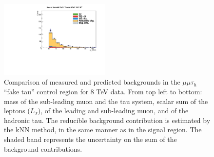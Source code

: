 \begin{figure}
\begin{center}
  \includegraphics[width=0.49\textwidth]{4_Analisys/pics/8TeV/plots/mmt/f3/Full/final-f3-tPt-Full.pdf}
  \caption{Comparison of measured and predicted backgrounds in the $\mu\mu\tau_h$ ``fake tau'' control region for 8 TeV data.
  From top left to bottom: mass of the sub-leading muon and the tau system, scalar sum of the leptons \pT ($L_T$), \pT of the leading and sub-leading muon, and \pT of the hadronic tau.
  The reducible background contribution is estimated by the kNN method, in the same manner as in the signal region.
  The shaded band represents the uncertainty on the sum of the background contributions.
  }
  \label{fig:LLT_mmt_f3_control_8TeV}
\end{center}
\end{figure}


